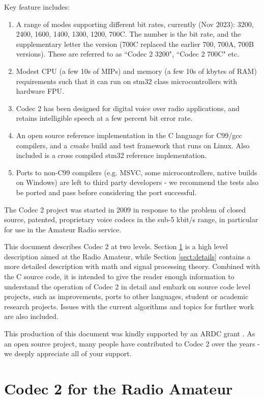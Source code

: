 \documentclass{article}
\begin{document}
Key feature includes:
\begin{enumerate}
\item A range of modes supporting different bit rates, currently (Nov 2023): 3200, 2400, 1600, 1400, 1300, 1200, 700C.  The number is the bit rate, and the supplementary letter the version (700C replaced the earlier 700, 700A, 700B versions). These are referred to as ``Codec 2 3200", ``Codec 2 700C" etc.
\item Modest CPU (a few 10s of MIPs) and memory (a few 10s of kbytes of RAM) requirements such that it can run on stm32 class microcontrollers with hardware FPU.
\item Codec 2 has been designed for digital voice over radio applications, and retains intelligible speech at a few percent bit error rate.
\item An open source reference implementation in the C language for C99/gcc compilers, and a \emph{cmake} build and test framework that runs on Linux.  Also included is a cross compiled stm32 reference implementation.
\item Ports to non-C99 compilers (e.g. MSVC, some microcontrollers, native builds on Windows) are left to third party developers - we recommend the tests also be ported and pass before considering the port successful.
\end{enumerate}

The Codec 2 project was started in 2009 in response to the problem of closed source, patented, proprietary voice codecs in the sub-5 kbit/s range, in particular for use in the Amateur Radio service.

This document describes Codec 2 at two levels.  Section \ref{sect:overview} is a high level description aimed at the Radio Amateur, while Section \ref{sect:details} contains a more detailed description with math and signal processing theory.  Combined with the C source code, it is intended to give the reader enough information to understand the operation of Codec 2 in detail and embark on source code level projects, such as improvements, ports to other languages, student or academic research projects.  Issues with the current algorithms and topics for further work are also included.

This production of this document was kindly supported by an ARDC grant \cite{ardc2023}.  As an open source project, many people have contributed to Codec 2 over the years - we deeply appreciate all of your support.

\section{Codec 2 for the Radio Amateur}
\label{sect:overview}
\end{document}
